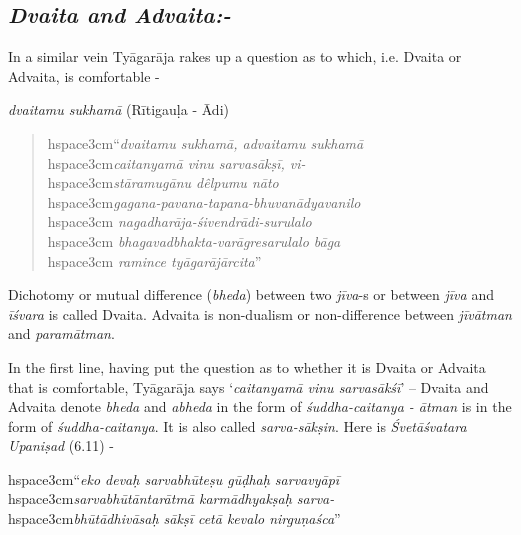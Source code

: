 \subsection*{\textit{Dvaita and Advaita:-}}

In a similar vein Tyāgarāja rakes up a question as to which, i.e. Dvaita or Advaita, is comfortable - 

\textit{dvaitamu sukhamā} (Rītigauḷa - Ādi)

\begin{verse}
hspace{3cm}“\textit{dvaitamu sukhamā, advaitamu sukhamā}\\hspace{3cm}\textit{caitanyamā vinu sarvasākṣī, vi-}\\hspace{3cm}\textit{stāramugānu dêlpumu nāto}\\hspace{3cm}\textit{gagana-pavana-tapana-bhuvanādyavanilo}\\hspace{3cm} \textit{nagadharāja-śivendrādi-surulalo}\\hspace{3cm} \textit{bhagavadbhakta-varāgresarulalo bāga}\\hspace{3cm} \textit{ramince tyāgarājārcita}”
\end{verse}

Dichotomy or mutual difference (\textit{bheda}) between two \textit{jīva}-s or between \textit{jīva} and \textit{īśvara} is called Dvaita. Advaita is non-dualism or non-difference between \textit{jīvātman} and \textit{paramātman}. 

In the first line, having put the question as to whether it is Dvaita or Advaita that is comfortable, Tyāgarāja says ‘\textit{caitanyamā vinu sarvasākśī}’ – Dvaita and Advaita denote \textit{bheda} and \textit{abheda} in the form of \textit{śuddha-caitanya - ātman} is in the form of \textit{śuddha-caitanya}. It is also called \textit{sarva-sākṣin}. Here is \textit{Śvetāśvatara Upaniṣad} (6.11) -

\begin{myquote}
hspace{3cm}“\textit{eko devaḥ sarvabhūteṣu gūḍhaḥ sarvavyāpī}\\hspace{3cm}\textit{sarvabhūtāntarātmā karmādhyakṣaḥ sarva-}\\hspace{3cm}\textit{bhūtādhivāsaḥ sākṣī cetā kevalo nirguṇaśca}”
\end{myquote}

